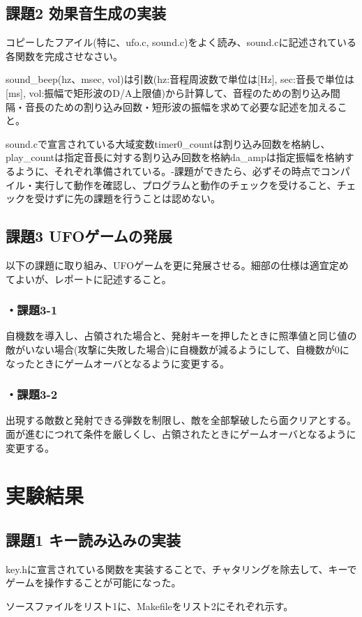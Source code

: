 ﻿\documentclass{jarticle}
\begin{document}
\subsection{課題2 効果音生成の実装}
コピーしたフアイル(特に、ufo.c, sound.c)をよく読み、sound.cに記述されている各関数を完成させなさい。


sound\_beep(hz、msec, vol)は引数(hz:音程周波数で単位は[Hz], sec:音長で単位は[ms], vol:振幅で矩形波のD/A上限値)から計算して、音程のための割り込み間隔・音長のための割り込み回数・短形波の振幅を求めて必要な記述を加えること。


sound.cで宣言されている大域変数timer0\_countは割り込み回数を格納し、play\_countは指定音長に対する割り込み回数を格納da\_ampは指定振幅を格納するように、それぞれ準備されている。-課題ができたら、必ずその時点でコンパイル・実行して動作を確認し、プログラムと動作のチェックを受けること、チェックを受けずに先の課題を行うことは認めない。


\subsection{課題3 UFOゲームの発展}
以下の課題に取り組み、UFOゲームを更に発展させる。細部の仕様は適宜定めてよいが、レポートに記述すること。
\subsubsection*{・課題3-1}
自機数を導入し、占領された場合と、発射キーを押したときに照準値と同じ値の敵がいない場合(攻撃に失敗した場合)に自機数が減るようにして、自機数が0になったときにゲームオーバとなるように変更する。
\subsubsection*{・課題3-2}
出現する敵数と発射できる弾数を制限し、敵を全部撃破したら面クリアとする。面が進むにつれて条件を厳しくし、占領されたときにゲームオーバとなるように変更する。


\section{実験結果}
\subsection{課題1 キー読み込みの実装}
key.hに宣言されている関数を実装することで、チャタリングを除去して、キーでゲームを操作することが可能になった。


ソースファイルをリスト1に、Makefileをリスト2にそれぞれ示す。
\end{document}
